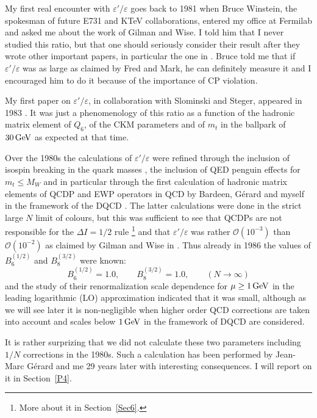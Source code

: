 \documentclass[12pt,a4paper]{article}
\newcommand{\ord}{\mathcal{O}}
\newcommand{\gev}{\, {\rm GeV}}
\newcommand{\bsi}{B_6^{(1/2)}}
\newcommand{\bei}{B_8^{(3/2)}}
\def\epe{\varepsilon'/\varepsilon}
\newcommand{\be}{\begin{equation}}
\newcommand{\ee}{\end{equation}}
\begin{document}
My first real encounter with $\epe$ goes back to 1981 when Bruce Winstein, the spokesman of future E731 and KTeV collaborations, entered my office at Fermilab and asked me about the work of Gilman and Wise. I told
him that I never studied this ratio, but that one should seriously consider
their result after they wrote other important papers, in particular the one in \cite{Gilman:1979bc}. Bruce told me that if $\epe$ was as large as claimed
by Fred and Mark, he can definitely measure it and I encouraged him to do
it because of the importance of CP violation.

My first paper on $\epe$, in collaboration with Slominski and Steger, appeared
in 1983 \cite{Buras:1983ap}. It was just a phenomenology of this ratio
as a function of the hadronic matrix element of $Q_6$, of the CKM parameters
and of  $m_t$ in the ballpark of $30\gev$ as expected at that time.

Over the 1980s the calculations of $\epe$
were refined through the inclusion of isospin breaking in the
quark masses \cite{Donoghue:1986nm,Buras:1987wc},
the inclusion of QED penguin effects for $m_t \le M_W$
\cite{Bijnens:1983ye,Donoghue:1986nm,Buras:1987wc,Sharpe:1987cx,Lusignoli:1988fz}
and in particular through the first calculation of hadronic matrix elements
of QCDP and EWP operators in QCD by Bardeen, G{\'e}rard and myself in
the framework of the DQCD \cite{Bardeen:1986vp,Bardeen:1986uz,Bardeen:1986vz}.
The latter calculations were done in the strict large $N$ limit of colours, but this
was sufficient to see that QCDPs are not responsible for the $\Delta I=1/2$ rule
\footnote{More about it in Section~\ref{Sec6}.}
and that $\epe$ was rather $\ord(10^{-3})$ than $\ord(10^{-2})$ as claimed
by Gilman and Wise in \cite{Gilman:1978wm}. Thus already in 1986 the values
of $\bsi$ and $\bei$ were known:
\be\label{LN}
\bsi=1.0, \qquad \bei=1.0, \qquad (N \to \infty)
\ee
and the study of their renormalization scale dependence for $\mu \ge 1\gev$ in
the leading logarithmic (LO) approximation 
indicated that it was small, although as we will see later it is non-negligible
when higher order QCD corrections are taken into account and scales below
$1\gev$ in the framework of DQCD are considered.

It is rather surprizing that we did not calculate these two parameters
including $1/N$ corrections in the 1980s.  Such a calculation has been performed by
Jean-Marc G{\'e}rard and me 29 years later with interesting consequences. I  will report on it in Section~\ref{P4}.
\end{document}
